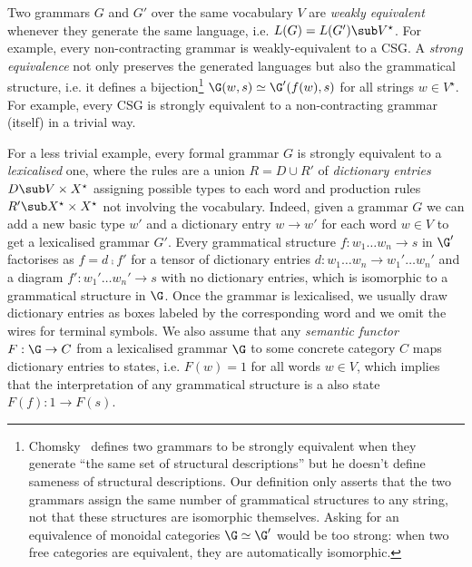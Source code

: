 Two grammars $G$ and $G'$ over the same vocabulary $V$ are \emph{weakly equivalent} whenever they generate the same language, i.e. $L(G) = L(G') \sub V^\star$.
For example, every non-contracting grammar is weakly-equivalent to a CSG.
A \emph{strong equivalence} not only preserves the generated languages but also the grammatical structure, i.e. it defines a bijection\footnote
{Chomsky~\cite{Chomsky63} defines two grammars to be strongly equivalent when they generate ``the same set of structural descriptions'' but he doesn't define sameness of structural descriptions.
Our definition only asserts that the two grammars assign the same number of grammatical structures to any string, not that these structures are isomorphic themselves.
Asking for an equivalence of monoidal categories $\G \simeq \G'$ would be too strong: when two free categories are equivalent, they are automatically isomorphic.} $\G(w, s) \simeq \G'(f(w), s)$ for all strings $w \in V^\star$.
For example, every CSG is strongly equivalent to a non-contracting grammar (itself) in a trivial way.

For a less trivial example, every formal grammar $G$ is strongly equivalent to a \emph{lexicalised} one, where the rules are a union $R = D \cup R'$ of \emph{dictionary entries} $D \sub V \times X^\star$ assigning possible types to each word and production rules $R' \sub X^\star \times X^\star$ not involving the vocabulary.
Indeed, given a grammar $G$ we can add a new basic type $w'$ and a dictionary entry $w \to w'$ for each word $w \in V$ to get a lexicalised grammar $G'$.
Every grammatical structure $f : w_1 \dots w_n \to s$ in $\G'$ factorises as $f = d \fcmp f'$ for a tensor of dictionary entries $d : w_1 \dots w_n \to w_1' \dots w_n'$ and a diagram $f' : w_1' \dots w_n' \to s$ with no dictionary entries, which is isomorphic to a grammatical structure in $\G$.
Once the grammar is lexicalised, we usually draw dictionary entries as boxes labeled by the corresponding word and we omit the wires for terminal symbols.
We also assume that any \emph{semantic functor} $F : \G \to C$ from a lexicalised grammar $\G$ to some concrete category $C$ maps dictionary entries to states, i.e. $F(w) = 1$ for all words $w \in V$, which  implies that the interpretation of any grammatical structure is a also state $F(f) : 1 \to F(s)$.

